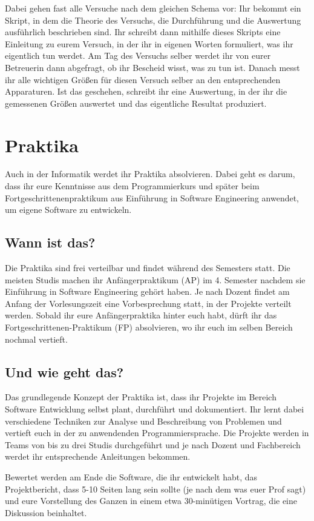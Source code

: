 Dabei gehen fast alle Versuche nach dem gleichen Schema vor: Ihr bekommt ein Skript, in dem die Theorie des Versuchs, die Durchführung und die Auswertung ausführlich beschrieben sind. Ihr schreibt dann mithilfe dieses Skripts eine Einleitung zu eurem Versuch, in der ihr in eigenen Worten formuliert, was ihr eigentlich tun werdet. Am Tag des Versuchs selber werdet ihr von eurer Betreuerin dann abgefragt, ob ihr Bescheid wisst, was zu tun ist. Danach messt ihr alle wichtigen Größen für diesen Versuch selber an den entsprechenden Apparaturen. Ist das geschehen, schreibt ihr eine Auswertung, in der ihr die gemessenen Größen auswertet und das eigentliche Resultat produziert.


\section{Praktika}

Auch in der Informatik werdet ihr Praktika absolvieren. Dabei geht es darum, dass ihr eure Kenntnisse aus dem Programmierkurs und später beim Fortgeschrittenenpraktikum aus Einführung in Software Engineering anwendet, um eigene Software zu entwickeln.

\subsection{Wann ist das?}
Die Praktika sind frei verteilbar und findet während des Semesters statt. Die meisten Studis machen ihr Anfängerpraktikum (\gls{AP}) im 4. Semester nachdem sie Einführung in Software Engineering gehört haben. Je nach Dozent findet am Anfang der Vorlesungszeit eine Vorbesprechung statt, in der Projekte verteilt werden.
Sobald ihr eure Anfängerpraktika hinter euch habt, dürft ihr das Fortgeschrittenen-Praktikum (\gls{FP}) absolvieren, wo ihr euch im selben Bereich nochmal vertieft.

\subsection{Und wie geht das?}
Das grundlegende Konzept der Praktika ist, dass ihr Projekte im Bereich Software Entwicklung selbst plant, durchführt und dokumentiert. Ihr lernt dabei verschiedene Techniken zur Analyse und Beschreibung von Problemen und vertieft euch in der zu anwendenden Programmiersprache. Die Projekte werden in Teams von bis zu drei Studis durchgeführt und je nach Dozent und Fachbereich werdet ihr entsprechende Anleitungen bekommen.

Bewertet werden am Ende die Software, die ihr entwickelt habt, das Projektbericht, dass 5-10 Seiten lang sein sollte (je nach dem was euer Prof sagt) und eure Vorstellung des Ganzen in einem etwa 30-minütigen Vortrag, die eine Diskussion beinhaltet.

